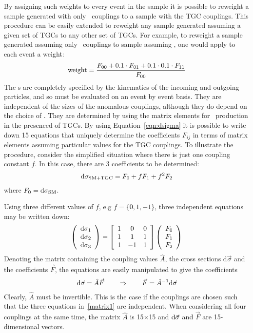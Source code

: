 By assigning such weights to every event in the sample it is possible to reweight a sample
generated with only \sm\ couplings to a sample with the TGC couplings.
This procedure can be easily extended to reweight any sample generated assuming
a given set of TGCs to any other set of TGCs. For example, to reweight a sample
generated assuming only \sm\ couplings to sample assuming , one would
apply to each event a weight:
\begin{eqnarray}\label{revisit}
{\rm weight} = \frac{F_{00} + 0.1 \cdot  F_{01} + 0.1\cdot 0.1 \cdot
F_{11}}{F_{00}}
\end{eqnarray}
The \Fij s are completely
specified by the kinematics of the incoming and outgoing particles, and so must
be evaluated on an event by event basis. They are
independent of the sizes of the anomalous couplings, although they do depend on
the choice of \formfactor. They are determined by using the matrix elements for
\ZZllll\ production in the presenced of TGCs. By using Equation~\ref{eqn:dsigma} it 
is possible to write down 15 equations that uniquely determine the 
coefficients $F_{ij}$ in terms of matrix elements assuming particular values
for the TGC couplings.
To illustrate the procedure, consider the simplified situation where 
there is just one coupling constant $f$. In this case, there are 3 coefficients 
to be determined:
\begin{eqnarray}\label{revisit2}
{\rm d}\sigma_{\rm SM+TGC} = F_0 + fF_1 + f^2F_2 
\end{eqnarray}
where  $F_0={\rm d}\sigma_{\rm SM}$.

Using three different values of $f$, e.g $f=\{0,1,-1\}$, three independent
equations may be written down:
\begin{eqnarray}\label{matrix1}
\left(\begin{array}{c}
{\rm d}\sigma_1\\
{\rm d}\sigma_2\\
{\rm d}\sigma_3
\end{array}\right) =
\left[\begin{array}{ccc}
1 & 0 & 0 \\
1 & 1 & 1 \\
1 & -1 & 1
\end{array}\right]
\left(\begin{array}{c}
F_0\\
F_1\\
F_2
\end{array}\right)
\end{eqnarray}
Denoting the matrix containing the coupling values $\hat{A}$, the cross sections
d$\vec{\sigma}$ and the coefficients $\vec{F}$, the equations are easily
manipulated to give the coefficients 
\begin{eqnarray}\label{matrix2} {\rm
d}\vec{\sigma}=\hat{A}\vec{F} \qquad \Rightarrow \qquad \vec{F}=\hat{A}^{-1}{\rm
d}\vec{\sigma} 
\end{eqnarray} 
Clearly, $\hat{A}$ must be invertible. This is the
case if the couplings are chosen such that the three equations in~\ref{matrix1}
are independent. When considering all four couplings at the same time, the
matrix $\hat{A}$ is 15$\times$15 and ${\rm d}\vec{\sigma}$ and $\vec{F}$ are
15-dimensional vectors.

